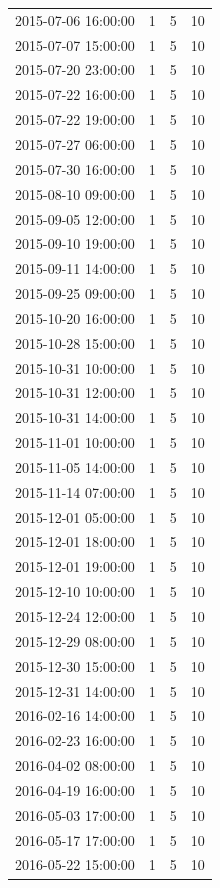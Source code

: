 \begin{tabular}{lrrr}
2015-07-06 16:00:00 & 1 & 5 & 10 \\
2015-07-07 15:00:00 & 1 & 5 & 10 \\
2015-07-20 23:00:00 & 1 & 5 & 10 \\
2015-07-22 16:00:00 & 1 & 5 & 10 \\
2015-07-22 19:00:00 & 1 & 5 & 10 \\
2015-07-27 06:00:00 & 1 & 5 & 10 \\
2015-07-30 16:00:00 & 1 & 5 & 10 \\
2015-08-10 09:00:00 & 1 & 5 & 10 \\
2015-09-05 12:00:00 & 1 & 5 & 10 \\
2015-09-10 19:00:00 & 1 & 5 & 10 \\
2015-09-11 14:00:00 & 1 & 5 & 10 \\
2015-09-25 09:00:00 & 1 & 5 & 10 \\
2015-10-20 16:00:00 & 1 & 5 & 10 \\
2015-10-28 15:00:00 & 1 & 5 & 10 \\
2015-10-31 10:00:00 & 1 & 5 & 10 \\
2015-10-31 12:00:00 & 1 & 5 & 10 \\
2015-10-31 14:00:00 & 1 & 5 & 10 \\
2015-11-01 10:00:00 & 1 & 5 & 10 \\
2015-11-05 14:00:00 & 1 & 5 & 10 \\
2015-11-14 07:00:00 & 1 & 5 & 10 \\
2015-12-01 05:00:00 & 1 & 5 & 10 \\
2015-12-01 18:00:00 & 1 & 5 & 10 \\
2015-12-01 19:00:00 & 1 & 5 & 10 \\
2015-12-10 10:00:00 & 1 & 5 & 10 \\
2015-12-24 12:00:00 & 1 & 5 & 10 \\
2015-12-29 08:00:00 & 1 & 5 & 10 \\
2015-12-30 15:00:00 & 1 & 5 & 10 \\
2015-12-31 14:00:00 & 1 & 5 & 10 \\
2016-02-16 14:00:00 & 1 & 5 & 10 \\
2016-02-23 16:00:00 & 1 & 5 & 10 \\
2016-04-02 08:00:00 & 1 & 5 & 10 \\
2016-04-19 16:00:00 & 1 & 5 & 10 \\
2016-05-03 17:00:00 & 1 & 5 & 10 \\
2016-05-17 17:00:00 & 1 & 5 & 10 \\
2016-05-22 15:00:00 & 1 & 5 & 10 \\

\end{tabular}
